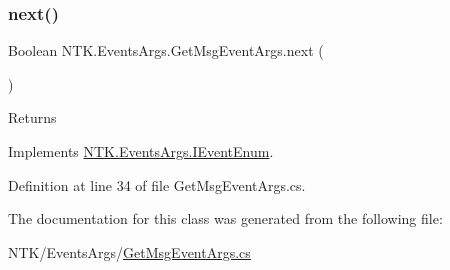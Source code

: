 \mbox{\label{class_n_t_k_1_1_events_args_1_1_get_msg_event_args_ac22d3fa7eb7350703d07127f9a5d5ca0}} 
\subsubsection{\texorpdfstring{next()}{next()}}
{\footnotesize\ttfamily Boolean N\+T\+K.\+Events\+Args.\+Get\+Msg\+Event\+Args.\+next (\begin{DoxyParamCaption}{ }\end{DoxyParamCaption})}





\begin{DoxyReturn}{Returns}

\end{DoxyReturn}


Implements \mbox{\hyperlink{interface_n_t_k_1_1_events_args_1_1_i_event_enum_a2b8c40d6d7e9899659aa5a469da93586}{N\+T\+K.\+Events\+Args.\+I\+Event\+Enum}}.



Definition at line 34 of file Get\+Msg\+Event\+Args.\+cs.



The documentation for this class was generated from the following file\+:\begin{DoxyCompactItemize}
\item 
N\+T\+K/\+Events\+Args/\mbox{\hyperlink{_get_msg_event_args_8cs}{Get\+Msg\+Event\+Args.\+cs}}\end{DoxyCompactItemize}
